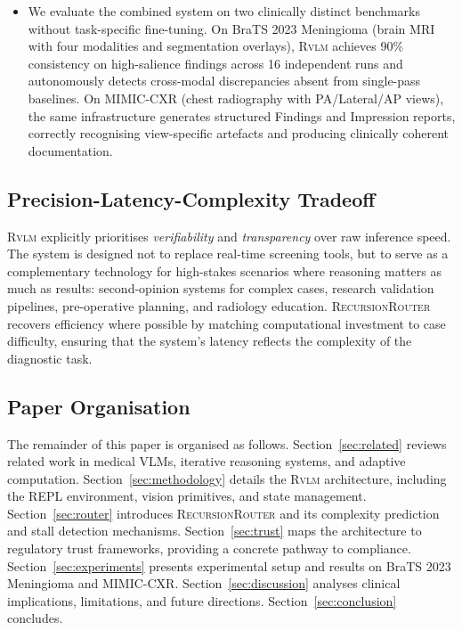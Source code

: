 \documentclass{article}
\newcommand{\RVLM}{\textsc{Rvlm}}
\newcommand{\RRouter}{\textsc{RecursionRouter}}
\begin{document}
\begin{itemize}[leftmargin=*,itemsep=4pt]
		\item We evaluate the combined system on two clinically distinct benchmarks without task-specific fine-tuning. On BraTS 2023 Meningioma (brain MRI with four modalities and segmentation overlays), \RVLM{} achieves 90\% consistency on high-salience findings across 16 independent runs and autonomously detects cross-modal discrepancies absent from single-pass baselines. On MIMIC-CXR (chest radiography with PA/Lateral/AP views), the same infrastructure generates structured Findings and Impression reports, correctly recognising view-specific artefacts and producing clinically coherent documentation.
	\end{itemize}
	
	\subsection{Precision-Latency-Complexity Tradeoff}
	
	\RVLM{} explicitly prioritises \emph{verifiability} and \emph{transparency} over raw inference speed. The system is designed not to replace real-time screening tools, but to serve as a complementary technology for high-stakes scenarios where reasoning matters as much as results: second-opinion systems for complex cases, research validation pipelines, pre-operative planning, and radiology education. \RRouter{} recovers efficiency where possible by matching computational investment to case difficulty, ensuring that the system's latency reflects the complexity of the diagnostic task.
	
	\subsection{Paper Organisation}
	
	The remainder of this paper is organised as follows. Section~\ref{sec:related} reviews related work in medical VLMs, iterative reasoning systems, and adaptive computation. Section~\ref{sec:methodology} details the \RVLM{} architecture, including the REPL environment, vision primitives, and state management. Section~\ref{sec:router} introduces \RRouter{} and its complexity prediction and stall detection mechanisms. Section~\ref{sec:trust} maps the architecture to regulatory trust frameworks, providing a concrete pathway to compliance. Section~\ref{sec:experiments} presents experimental setup and results on BraTS 2023 Meningioma and MIMIC-CXR. Section~\ref{sec:discussion} analyses clinical implications, limitations, and future directions. Section~\ref{sec:conclusion} concludes.
\end{document}
